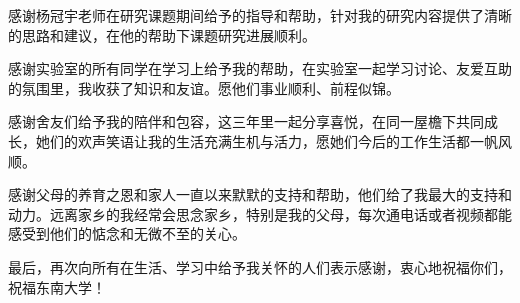 \documentclass[nomlist,masters]{seuthesix}
\begin{document}
感谢杨冠宇老师在研究课题期间给予的指导和帮助，针对我的研究内容提供了清晰的思路和建议，在他的帮助下课题研究进展顺利。

感谢实验室的所有同学在学习上给予我的帮助，在实验室一起学习讨论、友爱互助的氛围里，我收获了知识和友谊。愿他们事业顺利、前程似锦。

感谢舍友们给予我的陪伴和包容，这三年里一起分享喜悦，在同一屋檐下共同成长，她们的欢声笑语让我的生活充满生机与活力，愿她们今后的工作生活都一帆风顺。

感谢父母的养育之恩和家人一直以来默默的支持和帮助，他们给了我最大的支持和动力。远离家乡的我经常会思念家乡，特别是我的父母，每次通电话或者视频都能感受到他们的惦念和无微不至的关心。

最后，再次向所有在生活、学习中给予我关怀的人们表示感谢，衷心地祝福你们，祝福东南大学！


\end{document}

